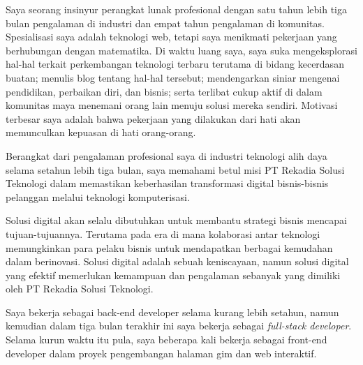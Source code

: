\documentclass[11pt, a4paper]{awesome-cv} %
\begin{document}
\makecvheader %

\makelettertitle %


\begin{cvletter}




Saya seorang insinyur perangkat lunak profesional dengan satu tahun lebih tiga bulan pengalaman di industri dan empat tahun pengalaman di komunitas. Spesialisasi saya adalah teknologi web, tetapi saya menikmati pekerjaan yang berhubungan dengan matematika. Di waktu luang saya, saya suka mengeksplorasi hal-hal terkait perkembangan teknologi terbaru terutama di bidang kecerdasan buatan; menulis blog tentang hal-hal tersebut; mendengarkan siniar mengenai pendidikan, perbaikan diri, dan bisnis; serta terlibat cukup aktif di dalam komunitas maya menemani orang lain menuju solusi mereka sendiri. Motivasi terbesar saya adalah bahwa pekerjaan yang dilakukan dari hati akan memunculkan kepuasan di hati orang-orang.



Berangkat dari pengalaman profesional saya di industri teknologi alih daya selama setahun lebih tiga bulan, saya memahami betul misi PT Rekadia Solusi Teknologi dalam memastikan keberhasilan transformasi digital bisnis-bisnis pelanggan melalui teknologi komputerisasi.

Solusi digital akan selalu dibutuhkan untuk membantu strategi bisnis mencapai tujuan-tujuannya. Terutama pada era di mana kolaborasi antar teknologi memungkinkan para pelaku bisnis untuk mendapatkan berbagai kemudahan dalam berinovasi. Solusi digital adalah sebuah keniscayaan, namun solusi digital yang efektif memerlukan kemampuan dan pengalaman sebanyak yang dimiliki oleh PT Rekadia Solusi Teknologi.



Saya bekerja sebagai back-end developer selama kurang lebih setahun, namun kemudian dalam tiga bulan terakhir ini saya bekerja sebagai \textit{full-stack developer}. Selama kurun waktu itu pula, saya beberapa kali bekerja sebagai front-end developer dalam proyek pengembangan halaman gim dan web interaktif.


\end{cvletter}
\end{document}
